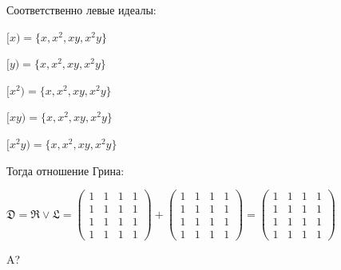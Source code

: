 \documentclass[bachelor, och, labwork]{shiza}
\begin{document}
      Соответственно левые идеалы:


      \begin{center}

        $[x) = \{x, x^2, xy, x^2y\}$

        $[y) = \{x, x^2, xy, x^2y\}$
  
        $[x^2) = \{x, x^2, xy, x^2y\}$
  
        $[xy) = \{x, x^2, xy, x^2y\}$
    
        $[x^2y) = \{x, x^2, xy, x^2y\}$

      \end{center}

      Тогда отношение Грина: 

      $\mathfrak{D} = \mathfrak{R} \vee \mathfrak{L} =
      \begin{pmatrix}
        1 & 1 & 1 & 1 \\
        1 & 1 & 1 & 1 \\
        1 & 1 & 1 & 1 \\
        1 & 1 & 1 & 1
      \end{pmatrix} +
      \begin{pmatrix}
        1 & 1 & 1 & 1 \\
        1 & 1 & 1 & 1 \\
        1 & 1 & 1 & 1 \\
        1 & 1 & 1 & 1
      \end{pmatrix} =
      \begin{pmatrix}
        1 & 1 & 1 & 1 \\
        1 & 1 & 1 & 1 \\
        1 & 1 & 1 & 1 \\
        1 & 1 & 1 & 1
      \end{pmatrix}$

      
    \conclusion
    
    A?
    
\end{document}
